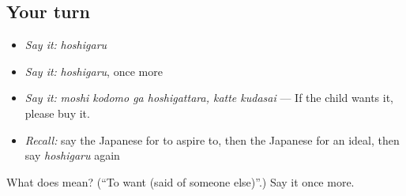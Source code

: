 \subsection*{Your turn}
\begin{itemize}
\raggedright
  \item \emph{Say it:} \emph{hoshigaru}
  \item \emph{Say it:} \emph{hoshigaru}, once more
  \item \emph{Say it:} \emph{moshi kodomo ga hoshigattara, katte kudasai} — If the child wants it, please buy it.
  \item \emph{Recall:} say the Japanese for to aspire to, then the Japanese for an ideal, then say \emph{hoshigaru} again
\end{itemize}

\begin{tcolorbox}[breakable,colback=teal!4,colframe=teal!35!black,title={Before you move on}]
What does  mean? (\textquotedblleft{}To want (said of someone else)\textquotedblright{}.) Say it once more.
\end{tcolorbox}
